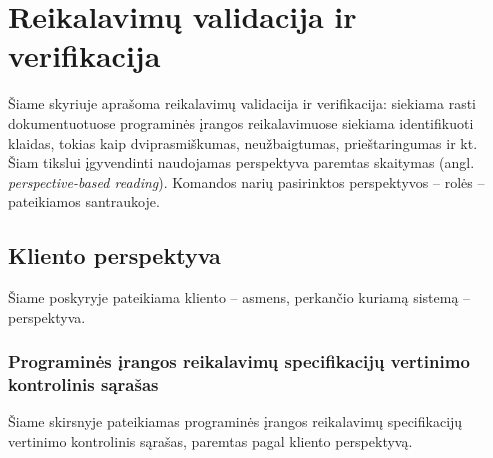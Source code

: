 \documentclass{VUMIFPSkursinis}
\begin{document}

\section{Reikalavimų validacija ir verifikacija}

Šiame skyriuje aprašoma reikalavimų validacija ir verifikacija: siekiama rasti dokumentuotuose programinės įrangos
reikalavimuose siekiama identifikuoti klaidas, tokias kaip dviprasmiškumas, neužbaigtumas, prieštaringumas ir kt.
Šiam tikslui įgyvendinti naudojamas perspektyva paremtas skaitymas (angl. \textit{perspective-based reading}). Komandos narių
pasirinktos perspektyvos -- rolės -- pateikiamos santraukoje.


\subsection{Kliento perspektyva}

Šiame poskyryje pateikiama kliento -- asmens, perkančio kuriamą sistemą -- perspektyva.

\subsubsection{Programinės įrangos reikalavimų specifikacijų vertinimo kontrolinis sąrašas}

Šiame skirsnyje pateikiamas programinės įrangos reikalavimų specifikacijų vertinimo kontrolinis sąrašas, paremtas pagal kliento perspektyvą.
\end{document}
